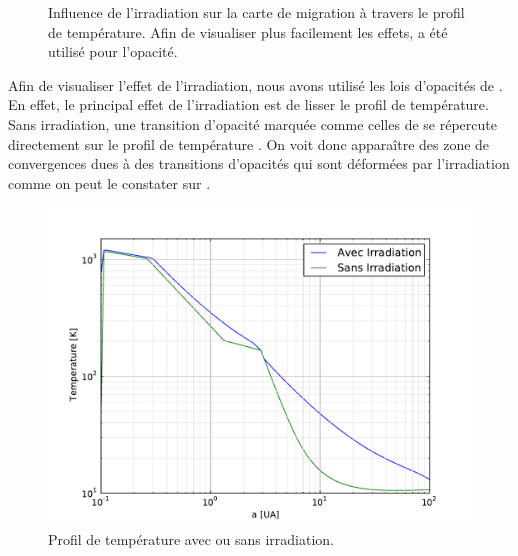 
\begin{figure}[htb]
\centering
{}\hfill
{}

\caption{Influence de l'irradiation sur la carte de migration à travers le profil de température. Afin de visualiser plus
facilement les effets, \cite{bell1994FU} a été utilisé pour l'opacité. }\label{fig:irradiation}
\end{figure}

Afin de visualiser l'effet de l'irradiation, nous avons utilisé les lois d'opacités de \cite{bell1994FU}. En effet,
le principal effet de l'irradiation est de lisser le profil de température. Sans irradiation, une transition d'opacité marquée
comme celles de \cite{bell1994FU} se répercute directement sur le profil de température .
On voit donc apparaître des zone de convergences dues à des transitions d'opacités qui sont déformées par
l'irradiation comme on peut le constater sur .

\begin{figure}[htb]
\centering
\includegraphics[width=0.6\linewidth]{figure/migration_map/temperature_with_irradiation.pdf}
\caption{Profil de température avec ou sans irradiation. }\label{fig:temp_profile_irradiation}
\end{figure}

